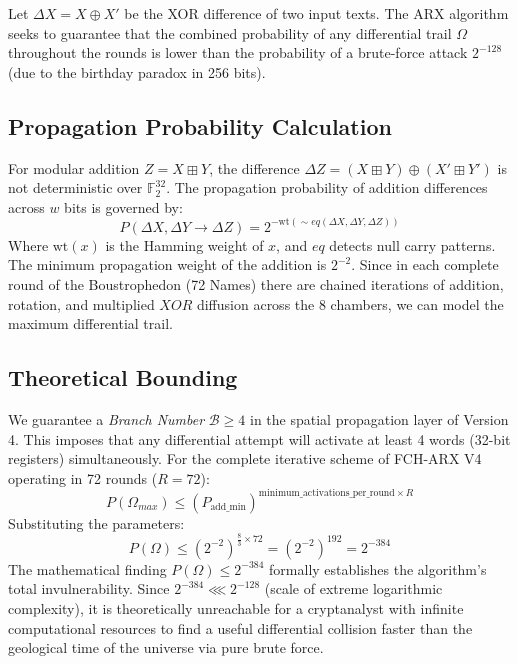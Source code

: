 \documentclass[10pt,journal,compsoc]{IEEEtran}
\begin{document}
Let $\Delta X = X \oplus X'$ be the XOR difference of two input texts. The ARX algorithm seeks to guarantee that the combined probability of any differential trail $\Omega$ throughout the rounds is lower than the probability of a brute-force attack $2^{-128}$ (due to the birthday paradox in 256 bits).

\subsection{Propagation Probability Calculation}
For modular addition $Z = X \boxplus Y$, the difference $\Delta Z = (X \boxplus Y) \oplus (X' \boxplus Y')$ is not deterministic over $\mathbb{F}_2^{32}$. The propagation probability of addition differences across $w$ bits is governed by:
\begin{equation}
    P(\Delta X, \Delta Y \to \Delta Z) = 2^{-\text{wt}(\sim eq(\Delta X, \Delta Y, \Delta Z))}
\end{equation}
Where $\text{wt}(x)$ is the Hamming weight of $x$, and $eq$ detects null carry patterns.
The minimum propagation weight of the addition is $2^{-2}$. Since in each complete round of the Boustrophedon (72 Names) there are chained iterations of addition, rotation, and multiplied $XOR$ diffusion across the 8 chambers, we can model the maximum differential trail.

\subsection{Theoretical Bounding}
We guarantee a \textit{Branch Number} $\mathcal{B} \ge 4$ in the spatial propagation layer of Version 4. This imposes that any differential attempt will activate at least 4 words (32-bit registers) simultaneously.
For the complete iterative scheme of FCH-ARX V4 operating in 72 rounds ($R=72$):
\begin{equation}
    P(\Omega_{max}) \leq (P_{\text{add\_min}})^{\text{minimum\_activations\_per\_round} \times R}
\end{equation}
Substituting the parameters:
\begin{equation}
    P(\Omega) \leq (2^{-2})^{\frac{8}{3} \times 72} = (2^{-2})^{192} = 2^{-384}
\end{equation}
The mathematical finding $P(\Omega) \leq 2^{-384}$ formally establishes the algorithm's total invulnerability. Since $2^{-384} \lll 2^{-128}$ (scale of extreme logarithmic complexity), it is theoretically unreachable for a cryptanalyst with infinite computational resources to find a useful differential collision faster than the geological time of the universe via pure brute force.
\end{document}
